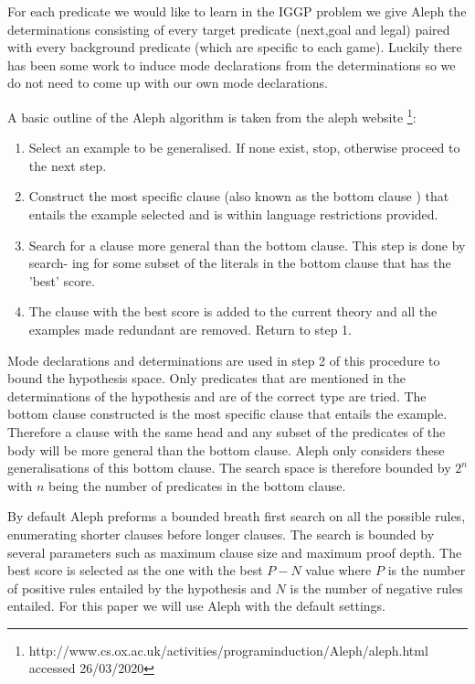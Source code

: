 \documentclass[a4paper,10pt]{report}
\begin{document}
For each predicate we would like to learn in the IGGP problem we give Aleph the determinations consisting of every target predicate (next,goal and legal) paired with every background predicate (which are specific to each game). Luckily there has been some work to induce mode declarations from the determinations \cite{McCreath/Meta-extraction} so we do not need to come up with our own mode declarations.

A basic outline of the Aleph algorithm is taken from the aleph website \footnote{http://www.cs.ox.ac.uk/activities/programinduction/Aleph/aleph.html accessed 26/03/2020}:
\begin{enumerate}
\item Select an example to be generalised. If none exist, stop, otherwise proceed to the
next step.
\item Construct the most specific clause (also known as the bottom clause \cite{Muggleton/Aleph}) that entails
the example selected and is within language restrictions provided.
\item Search for a clause more general than the bottom clause. This step is done by search-
ing for some subset of the literals in the bottom clause that has the 'best' score.
\item The clause with the best score is added to the current theory and all the examples
made redundant are removed. Return to step 1.
\end{enumerate}

Mode declarations and determinations are used in step 2 of this procedure to bound the hypothesis space. Only predicates that are mentioned in the determinations of the hypothesis and are of the correct type are tried. The bottom clause constructed is the most specific clause that entails the example. Therefore a clause with the same head and any subset of the predicates of the body will be more general than the bottom clause. Aleph only considers these generalisations of this bottom clause. The search space is therefore bounded by $2^n$ with $n$ being the number of predicates in the bottom clause.

By default Aleph preforms a bounded breath first search on all the possible rules, enumerating shorter clauses before longer clauses. The search is bounded by several parameters such as maximum clause size and maximum proof depth. The best score is selected as the one with the best $P - N$ value where $P$ is the number of positive rules entailed by the hypothesis and $N$ is the number of negative rules entailed. For this paper we will use Aleph with the default settings.
\end{document}
